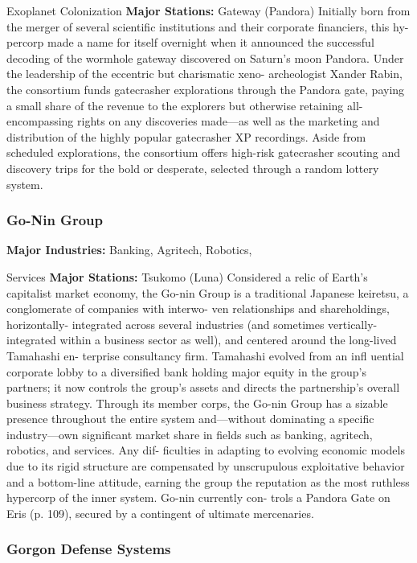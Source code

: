 Exoplanet Colonization
\textbf{Major Stations:} Gateway (Pandora)
Initially born from the merger of several scientific 
institutions and their corporate financiers, this hy-
percorp made a name for itself overnight when it 
announced the successful decoding of the wormhole 
gateway discovered on Saturn's moon Pandora. Under 
the leadership of the eccentric but charismatic xeno-
archeologist Xander Rabin, the consortium funds 
gatecrasher explorations through the Pandora gate, 
paying a small share of the revenue to the explorers 
but otherwise retaining all-encompassing rights on 
any discoveries made—as well as the marketing and 
distribution of the highly popular gatecrasher XP 
recordings. Aside from scheduled explorations, the 
consortium offers high-risk gatecrasher scouting and 
discovery trips for the bold or desperate, selected 
through a random lottery system.

\subsubsection{Go-Nin Group}

\textbf{Major Industries:} Banking, Agritech, Robotics, 

Services
\textbf{Major Stations:} Tsukomo (Luna)
Considered a relic of Earth's capitalist market 
economy, the Go-nin Group is a traditional Japanese 
keiretsu, a conglomerate of companies with interwo-
ven relationships and shareholdings, horizontally-
integrated across several industries (and sometimes 
vertically-integrated within a business sector as well), 
and centered around the long-lived Tamahashi en-
terprise consultancy firm. Tamahashi evolved from 
an infl uential corporate lobby to a diversified  bank 
holding major equity in the group's partners; it now 
controls the group's assets and directs the partnership's 
overall business strategy. Through its member corps, 
the Go-nin Group has a sizable presence throughout 
the entire system and—without dominating a specific 
industry—own significant market share in fields such 
as banking, agritech, robotics, and services. Any dif-
ficulties in adapting to evolving economic models due 
to its rigid structure are compensated by unscrupulous 
exploitative behavior and a bottom-line attitude, 
earning the group the reputation as the most ruthless 
hypercorp of the inner system. Go-nin currently con-
trols a Pandora Gate on Eris (p. 109), secured by a 
contingent of ultimate mercenaries.

\subsubsection{Gorgon Defense Systems}

